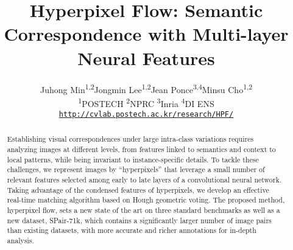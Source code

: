 \documentclass[10pt,twocolumn,letterpaper]{article}
\newcommand*{\affmark}[1][*]{\textsuperscript{#1}}
\begin{document}
\title{Hyperpixel Flow: Semantic Correspondence with Multi-layer Neural Features}





\author{Juhong Min\affmark[1,2]\hspace{0.8cm}Jongmin Lee\affmark[1,2]\hspace{0.8cm}Jean Ponce\affmark[3,4]\hspace{0.8cm}Minsu Cho\affmark[1,2]\vspace{1.5mm}\\
\affmark[1]POSTECH \hspace{1.5cm} 
\affmark[2]NPRC\footnotemark[1] \hspace{1.5cm}  
\affmark[3]Inria\vspace{3.0mm} \hspace{1.5cm} 
\affmark[4]DI ENS\footnotemark[2] \\
{\tt\small \url{http://cvlab.postech.ac.kr/research/HPF/}}
}

\maketitle


\newcommand{\mcho}[1]{\textcolor{magenta}{#1}}
\newcommand{\jmin}[1]{\textcolor{blue}{#1}}
\newcommand{\jmlee}[1]{\textcolor{cyan}{#1}}





\begin{abstract}
Establishing visual correspondences under large intra-class variations requires analyzing images at different levels, from features linked to semantics and context to local patterns, while being invariant to instance-specific details.
To tackle these challenges, we represent images by ``hyperpixels'' that leverage a small number of relevant features selected among early to late layers of a convolutional neural network. Taking advantage of the condensed features of hyperpixels, we develop an effective real-time matching algorithm based on Hough geometric voting. 
The proposed method, hyperpixel flow, sets a new state of the art on three standard benchmarks as well as a new dataset, SPair-71k, which contains a significantly larger number of image pairs than existing datasets, with more accurate and richer annotations for in-depth analysis. \end{abstract} 
\end{document}
